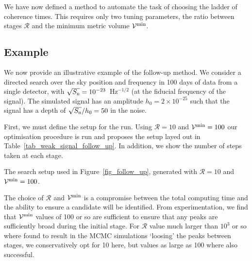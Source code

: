 \documentclass[aps, prd, twocolumn, superscriptaddress, floatfix, showpacs, nofootinbib, longbibliography]{revtex4-1}
\begin{document}
We have now defined a method to automate the task of choosing the ladder of
coherence times. This requires only two tuning parameters, the ratio between
stages $\mathcal{R}$ and the minimum metric volume $\mathcal{V}^{\min}$.

\subsection{Example}

We now provide an illustrative example of the follow-up method. We consider a
directed search over the sky position and frequency in 100 days of data from a
single detector, with $\sqrt{S_{\rm n}}=10^{-23}$~Hz$^{-1/2}$ (at the fiducial
frequency of the signal). The simulated signal has an amplitude
$h_0=2\times10^{-25}$ such that the signal has a depth of $\sqrt{S_{\rm n}}/h_0=50$
in the noise.

First, we must define the setup for the run. Using $\mathcal{R}=10$ and
$\mathcal{V}^{\rm min}=100$ our optimisation procedure is run and proposes the setup
layed out in Table~\ref{tab_weak_signal_follow_up}. In addition, we show the
number of steps taken at each stage.
\begin{table}[htb]
\caption{The search setup used in Figure~\ref{fig_follow_up}, generated with
$\mathcal{R}=10$ and $\mathcal{V}^{\rm min}=100$.}
\label{tab_weak_signal_follow_up}

\end{table}

The choice of $\mathcal{R}$ and $\mathcal{V}^{\rm min}$ is a compromise between the
total computing time and the ability to ensure a candidate will be identified.
From experimentation, we find that $\mathcal{V}^{\rm min}$ values of 100 or so are
sufficient to ensure that any peaks are sufficiently broad during the
initial stage. For $\mathcal{R}$ value much larger than $10^{3}$ or so where
found to result in the MCMC simulations `loosing' the peaks between stages, we
conservatively opt for 10 here, but values as large as 100 where also successful.
\end{document}
